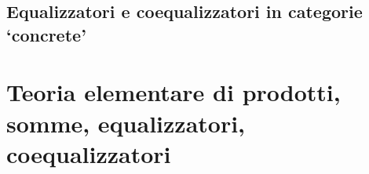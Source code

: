 \subsection{Equalizzatori e coequalizzatori in categorie `concrete'}
\begin{esercizi}
	\item
	\item
	\item
	\item
	\item
\end{esercizi}
\section{Teoria elementare di prodotti, somme, equalizzatori, coequalizzatori}
\Todo{}
